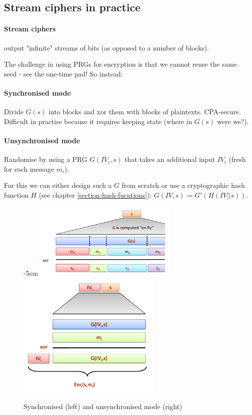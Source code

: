 \subsection{Stream ciphers in practice}

\paragraph{Stream ciphers} output "infinite" streams of bits (as opposed to a number of blocks).

The challenge in using PRGs for encryption is that we cannot reuse the same seed - see the one-time pad! So instead:

\paragraph{Synchronised mode} Divide $G(s)$ into blocks and xor them with blocks of plaintexts. CPA-secure. Difficult in practise because it requires keeping state (where in $G(s)$ were we?).

\paragraph{Unsynchronised mode} Randomise by using a PRG $G(IV_i, s)$ that takes an additional input $IV_i$ (fresh for each message $m_i$).

For this we can either design such a $G$ from scratch or use a cryptographic hash function $H$ (see chapter \ref{section-hash-fucntions}): $G(IV, s) \coloneqq G'(H( IV||s )) $.

\begin{figure}[h]
    \centering
    \addtolength{\leftskip} {-5cm}
    \addtolength{\rightskip}{-5cm}
    \includegraphics[width=7cm]{images/ch3-sc-sync.png}
    \includegraphics[width=7cm]{images/ch3-sc-unsync.png}
    \caption{Synchronised (left) and unsynchronised mode (right)}
    \label{fig:sc-sync-unsync}
\end{figure}

